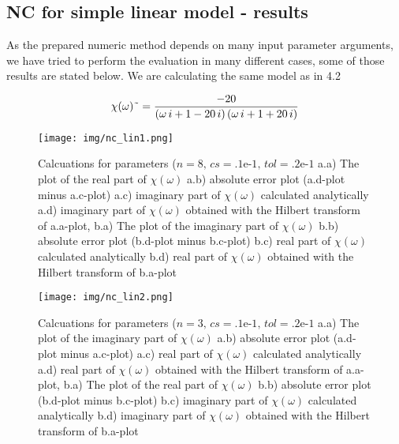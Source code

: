 \documentclass[12pt,twoside,a4paper]{article}
\numberwithin{equation}{subsection}
\numberwithin{figure}{subsection}
\begin{document}
\subsection{NC for simple linear model - results} \label{chap:nc_lin}

As the prepared numeric method depends on many input parameter arguments, we have tried to perform the evaluation in many different
cases, some of those results are stated below. We are calculating the same model as in 4.2

\begin{equation} \label{eq:nc_algoritm}
  \chi (\omega ) \symbol{126} = \frac { - 20}{(\omega \,i + 1 - 20\,i)\,(\omega \,i + 1 + 20\,i)}
\end{equation} 

\begin{figure}
  \texttt{[image: img/nc\_lin1.png]}
  \caption{Calcuations for parameters ($n=8, \,c s=\mbox{.1e-1}, \,tol=\mbox{.2e-1}$ 
     a.a) The plot of the real part of $\chi (\omega )$ 
     a.b) absolute error plot (a.d-plot minus a.c-plot) 
     a.c) imaginary part of $\chi (\omega )$ calculated analytically 
     a.d) imaginary part of $\chi (\omega )$ obtained with the Hilbert transform of a.a-plot, 
     b.a) The plot of the imaginary part of $\chi (\omega )$ 
     b.b) absolute error plot (b.d-plot minus b.c-plot) 
     b.c) real part of $\chi (\omega )$ calculated analytically 
     b.d) real part of $\chi (\omega )$ obtained with the Hilbert transform of b.a-plot 
     \label{fig:nc_lin1}
  }
\end{figure}

\begin{figure}
  \texttt{[image: img/nc\_lin2.png]}
  \caption{
     Calcuations for parameters ($n=3, \,cs=\mbox{.1e-1}, \,tol=\mbox{.2e-1}$
     a.a) The plot of the imaginary part of $\chi (\omega )$
     a.b) absolute error plot (a.d-plot minus a.c-plot) 
     a.c) real part of $\chi (\omega )$ calculated analytically 
     a.d) real part of $\chi (\omega )$ obtained with the Hilbert transform of a.a-plot, 
     b.a) The plot of the real part of $\chi (\omega )$
     b.b) absolute error plot (b.d-plot minus b.c-plot)
     b.c) imaginary part of $\chi (\omega )$ calculated analytically 
     b.d) imaginary part of $\chi (\omega )$ obtained with the Hilbert transform of b.a-plot
     \label{fig:nc_lin2} 
  }
\end{figure}  
\end{document}
